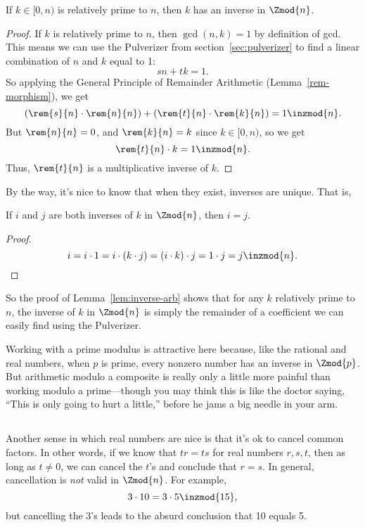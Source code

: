 \begin{lemma}\label{lem:inverse-arb} If $k \in [0,n)$ is relatively prime to
$n$, then $k$ has an inverse in $\Zmod{n}$.
\end{lemma}

\begin{proof}
If $k$ is relatively prime to $n$, then $\gcd(n, k) = 1$ by definition
of gcd.  This means we can use the Pulverizer from
section~\ref{sec:pulverizer} to find a linear combination of $n$ and
$k$ equal to 1:
\[
s n + t k = 1.
\]
So applying the General Principle of Remainder Arithmetic
(Lemma~\ref{rem-morphism}), we get
\[
(\rem{s}{n} \cdot \rem{n}{n}) + (\rem{t}{n} \cdot \rem{k}{n}) = 1 \inzmod{n}.
\]
But $\rem{n}{n} = 0$, and $\rem{k}{n} = k$ since $k \in [0,n)$, so we
  get
\[
\rem{t}{n} \cdot k = 1 \inzmod{n}.
\]
Thus, $\rem{t}{n}$ is a multiplicative inverse of $k$.
\end{proof}

By the way, it's nice to know that when they exist, inverses are
unique.  That is,
\begin{lemma}\label{uniq-inv}
If $i$ and $j$ are both inverses of $k$ in $\Zmod{n}$, then $i=j$.
\end{lemma}

\begin{proof}
\[
i = i \cdot 1 = i \cdot (k \cdot j) = (i \cdot k) \cdot j = 1 \cdot j = j \inzmod{n}.
\]
\end{proof}

So the proof of Lemma~\ref{lem:inverse-arb} shows that for any $k$
relatively prime to $n$, the inverse of $k$ in $\Zmod{n}$ is simply
the remainder of a coefficient we can easily find using the
Pulverizer.

Working with a prime modulus is attractive here because, like the
rational and real numbers, when $p$ is prime, every nonzero number has
an inverse in $\Zmod{p}$.  But arithmetic modulo a composite is really
only a little more painful than working modulo a prime---though you
may think this is like the doctor saying, ``This is only going to hurt
a little,'' before he jams a big needle in your arm.

\subsection{}

Another sense in which real numbers are nice is that it's ok to cancel
common factors.  In other words, if we know that $t r = t s$ for real
numbers $r,s,t$, then as long as $t \neq 0$, we can cancel the $t$'s
and conclude that $r = s$.  In general, cancellation is \emph{not}
valid in $\Zmod{n}$.  For example,
\begin{equation}\label{3103515}
3 \cdot 10 = 3 \cdot 5 \inzmod{15},
\end{equation}
but cancelling the 3's leads to the absurd conclusion that 10 equals
5.

